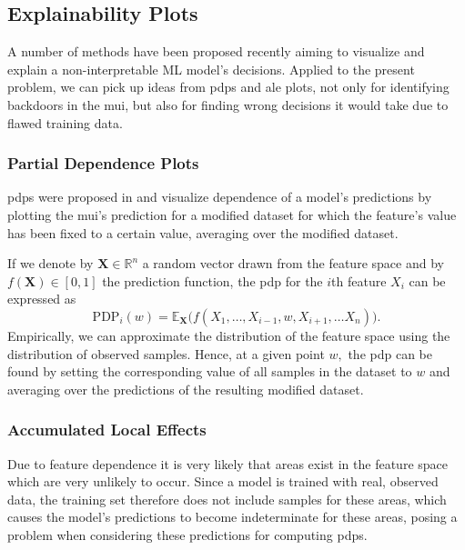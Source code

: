 \documentclass[10pt,sigconf,letterpaper,dvipsnames]{acmart}
\begin{document}
\subsection{Explainability Plots} \label{sec:plots}
A number of methods have been proposed recently aiming to visualize and explain a non-interpretable ML model's decisions.
Applied to the present problem, we can pick up ideas from \glspl{pdp} and \gls{ale} plots, not only for identifying backdoors in the \gls{mui}, but also for finding wrong decisions it would take due to flawed training data.

\subsubsection{Partial Dependence Plots}
\glspl{pdp} were proposed in \cite{friedman_greedy_2001} and visualize dependence of a model's predictions by plotting the \gls{mui}'s prediction for a modified dataset for which the feature's value has been fixed to a certain value, averaging over the modified dataset.

If we denote by $\boldsymbol X \in \mathbb R ^n$ a random vector drawn from the feature space and by $f(\boldsymbol X) \in [0,1]$ the  prediction function, the \gls{pdp} for the $i$th feature $X_i$ can be expressed as
\begin{equation}
\text{PDP}_i(w) = \mathbb E_{\boldsymbol X}\Big(f(X_1,\ldots,X_{i-1},w,X_{i+1},\ldots X_n)\Big) . %
\end{equation}
Empirically, we can approximate the distribution of the feature space using the distribution of observed samples. Hence, at a given point $w,$ the \gls{pdp} can be found by setting the corresponding value of all samples in the dataset to $w$ and averaging over the predictions of the resulting modified dataset.

\subsubsection{Accumulated Local Effects}
Due to feature dependence it is very likely that areas exist in the feature space which are very unlikely
to occur. Since a model is trained with real, observed data, the training set therefore does not include samples for these areas, which causes the model's predictions to become indeterminate for these areas, %
posing a 
problem when considering these predictions for computing \glspl{pdp}.
\end{document}
